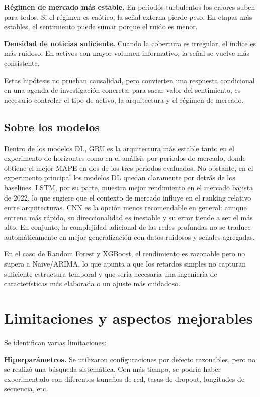 \textbf{Régimen de mercado más estable.} En periodos turbulentos los errores suben para todos. Si el régimen es caótico, la señal externa pierde peso. En etapas más estables, el sentimiento puede sumar porque el ruido es menor.

\textbf{Densidad de noticias suficiente.} Cuando la cobertura es irregular, el índice es más ruidoso. En activos con mayor volumen informativo, la señal se vuelve más consistente.

Estas hipótesis no prueban causalidad, pero convierten una respuesta condicional en una agenda de investigación concreta: para sacar valor del sentimiento, es necesario controlar el tipo de activo, la arquitectura y el régimen de mercado.

\subsection{Sobre los modelos}

Dentro de los modelos DL, GRU es la arquitectura más estable tanto en el experimento de horizontes como en el análisis por periodos de mercado, donde obtiene el mejor MAPE en dos de los tres periodos evaluados. No obstante, en el experimento principal los modelos DL quedan claramente por detrás de los baselines. LSTM, por su parte, muestra mejor rendimiento en el mercado bajista de 2022, lo que sugiere que el contexto de mercado influye en el ranking relativo entre arquitecturas. CNN es la opción menos recomendable en general: aunque entrena más rápido, su direccionalidad es inestable y su error tiende a ser el más alto. En conjunto, la complejidad adicional de las redes profundas no se traduce automáticamente en mejor generalización con datos ruidosos y señales agregadas.

En el caso de Random Forest y XGBoost, el rendimiento es razonable pero no supera a Naive/ARIMA, lo que apunta a que los retardos simples no capturan suficiente estructura temporal y que sería necesaria una ingeniería de características más elaborada o un ajuste más cuidadoso.

\section{Limitaciones y aspectos mejorables}

Se identifican varias limitaciones:

\textbf{Hiperparámetros.} Se utilizaron configuraciones por defecto razonables, pero no se realizó una búsqueda sistemática. Con más tiempo, se podría haber experimentado con diferentes tamaños de red, tasas de dropout, longitudes de secuencia, etc.

